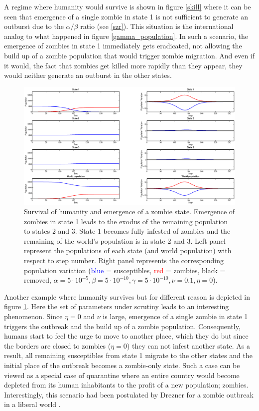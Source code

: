 \documentclass[11pt]{article} %
\begin{document}
A regime where humanity would survive is shown in figure \ref{skill} where it can be seen that emergence of a single zombie in state 1 is not sufficient to generate an outburst due to the $\alpha/\beta$ ratio (see \ref{szr}). This situation is the international analog to what happened in figure \ref{gamma_population}. In such a scenario, the emergence of zombies in state 1 immediately gets eradicated, not allowing the build up of a zombie population that would trigger zombie migration. And even if it would, the fact that zombies get killed more rapidly than they appear, they would neither generate an outburst in the other states.




\begin{figure}[h!]
\centerline{
\includegraphics[scale=0.35]{../images/Matlab_figures/example_exode.eps}}
\caption{Survival of humanity and emergence of a zombie state. Emergence of zombies in state 1 leads to the exodus of the remaining population to states 2 and 3. State 1 becomes fully infested of zombies and the remaining of the world's population is in state 2 and 3. Left panel represent the populations of each state (and world population) with respect to step number. Right panel represents the corresponding population variation (\textcolor{blue}{blue} = susceptibles, \textcolor{red}{red} = zombies, black = removed, $\alpha=5\cdot10^{-5},  \beta=5\cdot10^{-10},  \gamma=5\cdot10^{-10},  \nu=0.1,  \eta=0$). \label{exodus} }
\end{figure}
Another example where humanity survives but for different reason is depicted in figure \ref{exodus}.
Here the set of parameters under scrutiny leads to an interesting phenomenon. Since $\eta=0$ and $\nu$ is large, emergence of a single zombie in state 1 triggers the outbreak and the build up of a zombie population. Consequently, humans start to feel the urge to move to another place, which they do but since the borders are closed to zombies ($\eta=0$) they can not infest another state. As a result, all remaining susceptibles from state 1 migrate to the other states and the initial place of the outbreak becomes a zombie-only state. Such a case can be viewed as a special case of quarantine where an entire country would become depleted from its human inhabitants to the profit of a new population; zombies. Interestingly, this scenario had been postulated by Drezner for a zombie outbreak in a liberal world \cite{drezner}. 
\end{document}
